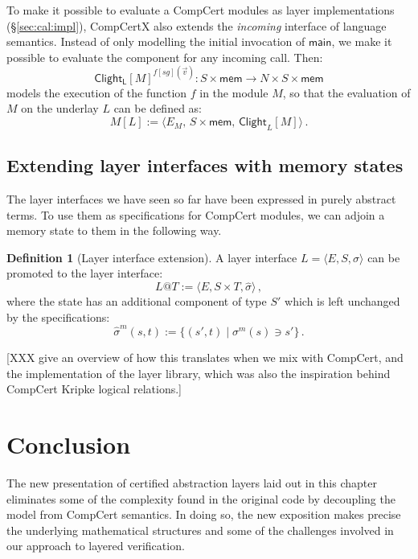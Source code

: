 \documentclass[draft,11pt]{report}
\theoremstyle{definition}
\newtheorem{definition}[theorem]{Definition}
\newcommand{\kw}[1]{\ensuremath{ \mathsf{#1} }}
\begin{document}
To make it possible to evaluate a CompCert modules
as layer implementations (\S\ref{sec:cal:impl}),
CompCertX also extends the \emph{incoming} interface
of language semantics.
Instead of only modelling the initial
invocation of $\kw{main}$,
we make it possible to evaluate the component
for any incoming call.
Then:
\[
  \kw{Clight_L}[M]^{f[\mathit{sg}](\vec{v})} :
    S \times \kw{mem} \rightarrow N \times S \times \kw{mem}
\]
models the execution of the function $f$
in the module $M$,
so that the evaluation of $M$ on the underlay $L$
can be defined as:
\[
  M[L] :=
    \langle
      E_M, \,
      S \times \kw{mem}, \,
      \kw{Clight}_L[M]
    \rangle
  \,.
\]

\subsection{Extending layer interfaces with memory states}

The layer interfaces we have seen so far
have been expressed in purely abstract terms.
To use them as specifications for CompCert modules,
we can adjoin a memory state to them in the following way.

\begin{definition}[Layer interface extension]
A layer interface $L = \langle E, S, \sigma \rangle$
can be promoted to the layer interface:
\[
  L@T := \langle E, S \times T, \hat{\sigma} \rangle
  \,,
\]
where the state has an additional component
of type $S'$ which is left unchanged by the specifications:
\[
  \hat{\sigma}^m(s, t) := \{ (s', t) \mid \sigma^m(s) \ni s' \}
  \,.
\]
\end{definition}




[XXX give an overview of how this translates
when we mix with CompCert,
and the implementation of the layer library,
which was also the inspiration behind
CompCert Kripke logical relations.]


\section{Conclusion} %

The new presentation of certified abstraction layers
laid out in this chapter
eliminates some of the complexity found in the original code
by decoupling the model from CompCert semantics.
In doing so,
the new exposition makes precise the underlying mathematical structures
and some of the challenges involved in
our approach to layered verification.
\end{document}
